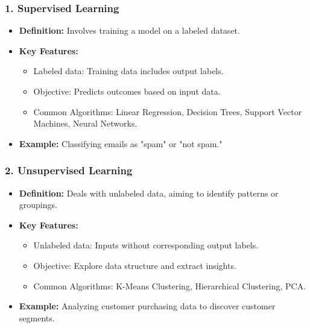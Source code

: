 \documentclass{beamer}
\begin{document}
\begin{frame}[fragile]
    \frametitle{1. Supervised Learning}
    \begin{itemize}
        \item \textbf{Definition:} Involves training a model on a labeled dataset.
        \item \textbf{Key Features:}
            \begin{itemize}
                \item Labeled data: Training data includes output labels.
                \item Objective: Predicts outcomes based on input data.
                \item Common Algorithms: Linear Regression, Decision Trees, Support Vector Machines, Neural Networks.
            \end{itemize}
        \item \textbf{Example:} Classifying emails as "spam" or "not spam."
    \end{itemize}
\end{frame}

\begin{frame}[fragile]
    \frametitle{2. Unsupervised Learning}
    \begin{itemize}
        \item \textbf{Definition:} Deals with unlabeled data, aiming to identify patterns or groupings.
        \item \textbf{Key Features:}
            \begin{itemize}
                \item Unlabeled data: Inputs without corresponding output labels.
                \item Objective: Explore data structure and extract insights.
                \item Common Algorithms: K-Means Clustering, Hierarchical Clustering, PCA.
            \end{itemize}
        \item \textbf{Example:} Analyzing customer purchasing data to discover customer segments.
    \end{itemize}
\end{frame}
\end{document}
